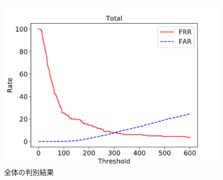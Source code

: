 \documentclass[a4j]{jarticle}%
\begin{document}
\begin{figure}[!t]
  \begin{center}
    \includegraphics[width=1\linewidth]{tex_fig/EER_total.eps}
  \end{center}
    \vspace{-8mm}
  \caption{全体の判別結果}
  \label{EER_total}
\end{figure}




\end{document}

